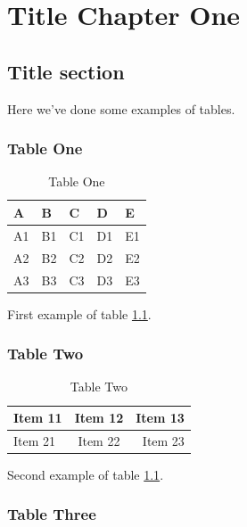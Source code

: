 \chapter{Title Chapter One}

\section{Title section}

Here we've done some examples of tables.

\subsection{Table One}
\begin{table}[h]
  \centering
  \begin{tabular}{|lllll|}
    \toprule
    A  & B  & C  & D  & E  \\
    \midrule
    A1 & B1 & C1 & D1 & E1 \\
    A2 & B2 & C2 & D2 & E2 \\
    A3 & B3 & C3 & D3 & E3 \\
    \bottomrule
  \end{tabular}
  \caption{Table One}
  \label{Tab:tableone}
\end{table}
First example of table \ref{Tab:tableone}.
\subsection{Table Two}

\begin{table}[h]
  \centering
  \begin{tabular}{|l|c|r|}
    \hline
    Item 11 & Item 12 & Item 13 \\
    \hline
    Item 21 & Item 22 & Item 23 \\
    \hline
  \end{tabular}
  \caption{Table Two}
  \label{Tab:tabletwo}
\end{table}
Second example of table \ref{Tab:tableone}.
\lipsum[1-1]
\subsection{Table Three}

